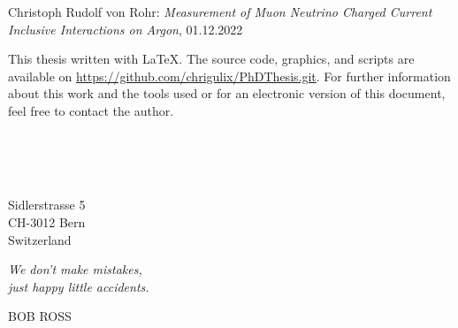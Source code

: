 \frontmatter


\thispagestyle{empty}
\mbox{}
\vskip 12cm
\noindent
Christoph Rudolf von Rohr: \textit{Measurement of Muon Neutrino Charged Current Inclusive Interactions on Argon}, 01.12.2022

\noindent
\doclicenseThis

\noindent
This thesis written with \LaTeX. The source code, graphics, and scripts are available on \url{https://github.com/chrigulix/PhDThesis.git}. For further information about this work and the tools used or for an electronic version of this document, feel free to contact the author.
\vskip 11pt

\vskip 11pt
\noindent
\rauthor\\
\remail\\
\vskip 11pt

\vskip 11pt
\noindent \rschool\\
\noindent Sidlerstrasse 5\\
\noindent CH-3012 Bern\\
\noindent Switzerland\\

\cleardoublepage 

\thispagestyle{empty}
\null\vfill

\settowidth{}
\begin{center}
\parbox{\boradest}{
  \raggedright{\huge\itshape
   We don't make mistakes, \\ 
   just happy little accidents. \par\bigskip
  }   
  \raggedleft\Large\MakeUppercase{Bob Ross}\par%
}
\end{center}

\vfill\vfill

\cleardoublepage

\newcommand{\abstracttitle}{Abstract}
\newenvironment{abstract}{
	\mbox{}
	\vskip 7cm
	\begin{center}
		{\bfseries \abstracttitle\vspace{-0.5em}\vspace{0pt}}
	\end{center}
	\quotation
}
{\endquotation}

